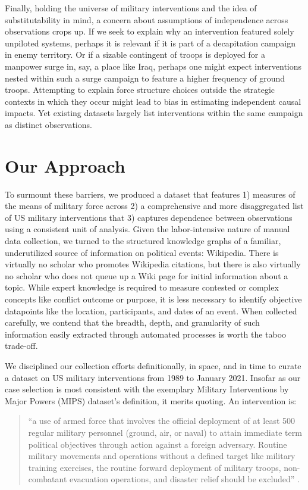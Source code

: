 \documentclass[fleqn,12pt]{article}
\begin{document}
Finally, holding the universe of military interventions and the idea of substitutability in mind, a concern about assumptions of independence across observations crops up. If we seek to explain why an intervention featured solely unpiloted systems, perhaps it is relevant if it is part of a decapitation campaign in enemy territory. Or if a sizable contingent of troops is deployed for a manpower surge in, say, a place like Iraq, perhaps one might expect interventions nested within such a surge campaign to feature a higher frequency of ground troops. Attempting to explain force structure choices outside the strategic contexts in which they occur might lead to bias in estimating independent causal impacts. Yet existing datasets largely list interventions within the same campaign as distinct observations.

\section*{Our Approach}
To surmount these barriers, we produced a dataset that features 1) measures of the means of military force across 2) a comprehensive and more disaggregated list of US military interventions that 3) captures dependence between observations using a consistent unit of analysis. Given the labor-intensive nature of manual data collection, we turned to the structured knowledge graphs of a familiar, underutilized source of information on political events: Wikipedia. There is virtually no scholar who promotes Wikipedia citations, but there is also virtually no scholar who does not queue up a Wiki page for initial information about a topic. While expert knowledge is required to measure contested or complex concepts like conflict outcome or purpose, it is less necessary to identify objective datapoints like the location, participants, and dates of an event. When collected carefully, we contend that the breadth, depth, and granularity of such information easily extracted through automated processes is worth the taboo trade-off.

We disciplined our collection efforts definitionally, in space, and in time to curate a dataset on US military interventions from 1989 to January 2021. Insofar as our case selection is most consistent with the exemplary Military Interventions by Major Powers (MIPS) dataset’s definition, it merits quoting. An intervention is: 

\begin{quote}\singlespacing
``a use of armed force that involves the official deployment of at least 500 regular military personnel (ground, air, or naval) to attain immediate term political objectives through action against a foreign adversary. Routine military movements and operations without a defined target like military training exercises, the routine forward deployment of military troops, non-combatant evacuation operations, and disaster relief should be excluded” \citep[][3]{SullivanKoch09}. 
\end{quote}
\end{document}
